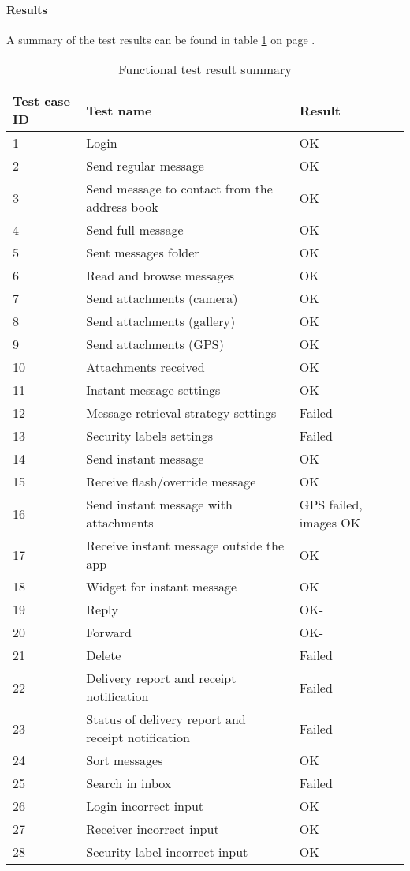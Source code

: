 			\paragraph{Results}
				A summary of the test results can be found in table \ref{tab:caseresults} on page \pageref{tab:caseresults}.
				\begin{table}
					\begin{tabular}{l|l|l}\hline
						Test case ID &Test name&Result \\ \hline
						1&Login&OK\\
						2&Send regular message&OK\\
						3&Send message to contact from the address book&OK\\
						4&Send full message&OK\\
						5&Sent messages folder&OK\\
						6&Read and browse messages&OK\\
						7&Send attachments (camera)&OK\\
						8&Send attachments (gallery)&OK\\
						9&Send attachments (GPS)&OK\\
						10&Attachments received&OK\\
						11&Instant message settings&OK\\
						12&Message retrieval strategy settings&Failed\\
						13&Security labels settings&Failed\\
						14&Send instant message&OK\\
						15&Receive flash/override message&OK\\
						16&Send instant message with attachments&GPS failed, images OK\\
						17&Receive instant message outside the app&OK\\
						18&Widget for instant message&OK\\
						19&Reply&OK-\\
						20&Forward&OK-\\
						21&Delete&Failed\\
						22&Delivery report and receipt notification&Failed\\
						23&Status of delivery report and receipt notification&Failed\\
						24&Sort messages&OK\\
						25&Search in inbox&Failed\\	
						26&Login incorrect input&OK\\
						27&Receiver incorrect input&OK\\
						28&Security label incorrect input&OK\\ \hline
					\end{tabular}
				\caption{Functional test result summary} \label{tab:caseresults}
			\end{table}
